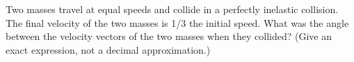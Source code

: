 Two masses travel at equal speeds and collide in a perfectly
inelastic collision. The final velocity of the two masses is 1/3
the initial speed. What was the angle between
the velocity vectors of the two masses when they collided? (Give
an exact expression, not a decimal approximation.)
